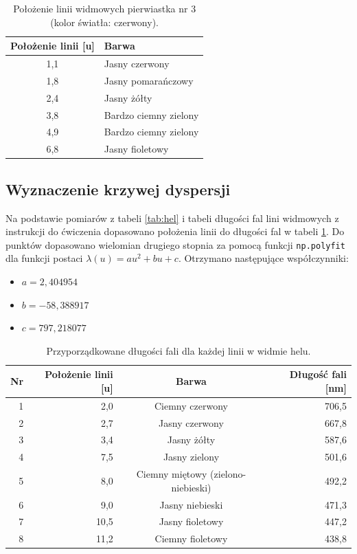 \documentclass[a4paper,12pt]{article}
\begin{document}
\begin{table}[H]
    \centering
    \begin{tabular}{|c|l|}
        \hline
        Położenie linii [u] & Barwa \\ \hline
        1{,}1 & Jasny czerwony \\ \hline
        1{,}8 & Jasny pomarańczowy \\ \hline
        2{,}4 & Jasny żółty \\ \hline
        3{,}8 & Bardzo ciemny zielony \\ \hline
        4{,}9 & Bardzo ciemny zielony \\ \hline
        6{,}8 & Jasny fioletowy \\ \hline
    \end{tabular}
    \caption{Położenie linii widmowych pierwiastka nr 3 (kolor światła: czerwony).}
\end{table}

\subsection{Wyznaczenie krzywej dyspersji}

Na podstawie pomiarów z tabeli \ref{tab:hel} i tabeli długości fal lini widmowych z instrukcji do ćwiczenia dopasowano położenia linii do długości fal w tabeli \ref{tab:hel_dispersion}. Do punktów dopasowano wielomian drugiego stopnia za pomocą funkcji \texttt{np.polyfit} dla funkcji postaci $\lambda(u) = au^2 + bu + c$. Otrzymano następujące współczynniki:
\begin{itemize}
    \item $a = 2{,}404954$
    \item $b = -58{,}388917$
    \item $c = 797{,}218077$
\end{itemize}

\begin{table}[H]
    \centering
    \begin{tabular}{|r|r|c|r|}
        \hline
        Nr & Położenie linii [u] & Barwa  & Długość fali [nm] \\ \hline
        1 & 2{,}0 & Ciemny czerwony & 706,5  \\ \hline
        2 & 2{,}7 & Jasny czerwony & 667,8\\ \hline
        3 & 3{,}4 & Jasny żółty & 587,6 \\ \hline
        4 & 7{,}5 & Jasny zielony & 501,6 \\ \hline
        5 & 8{,}0 & Ciemny miętowy (zielono-niebieski) & 492,2\\ \hline
        6 & 9{,}0 & Jasny niebieski & 471,3 \\ \hline
        7 & 10{,}5 & Jasny fioletowy & 447,2 \\ \hline
        8 & 11{,}2 & Ciemny fioletowy & 438,8 \\ \hline
    \end{tabular}
    \caption{Przyporządkowane długości fali dla każdej linii w widmie helu.}
    \label{tab:hel_dispersion}
\end{table}
\end{document}
